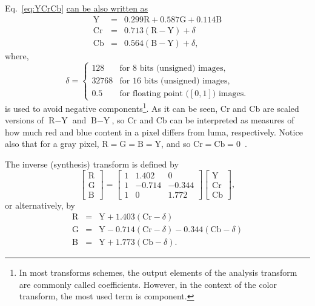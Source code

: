 Eq.~\ref{eq:YCrCb}
\href{https://docs.opencv.org/3.4/de/d25/imgproc_color_conversions.html}{can
  be also written as}
\begin{equation}
  \begin{array}{lcl}
    \text{Y}  & = & 0.299\text{R} + 0.587\text{G} + 0.114\text{B} \\
    \text{Cr} & = & 0.713(\text{R} - \text{Y}) + \delta \\
    \text{Cb} & = & 0.564(\text{B} - \text{Y}) + \delta,
  \end{array}
  \label{eq:analysis}
\end{equation}
where,
\begin{equation}
  \delta = \left\{
  \begin{array}{ll}
    128 & \text{for 8 bits (unsigned) images},\\
    32768 & \text{for 16 bits (unsigned) images},\\
    0.5 & \text{for floating point (}[0,1]\text{) images}.
  \end{array}
  \right.
  \label{eq:iYCrCb}
\end{equation}
is used to avoid negative components\footnote{In most transforms
  schemes, the output elements of the analysis transform are commonly
  called coefficients. However, in the context of the color transform,
  the most used term is component.}. As it can be seen, Cr and Cb are
scaled versions of $\text{R} - \text{Y}$ and $\text{B} - \text{Y}$, so
Cr and Cb can be interpreted as measures of how much red and blue
content in a pixel differs from luma, respectively. Notice also that
for a gray pixel, $\text{R}=\text{G}=\text{B}=\text{Y}$, and so
$\text{Cr}=\text{Cb}=0$~\cite{malvar2008lifting}.

The inverse (synthesis) transform is defined by
\begin{equation}
  \begin{bmatrix}
    \text{R} \\
    \text{G} \\
    \text{B}
  \end{bmatrix}
  =
  \begin{bmatrix}
    1  &  1.402  & 0 \\ 
    1  &  -0.714  &  -0.344 \\ 
    1  & 0  & 1.772
  \end{bmatrix}
  \begin{bmatrix}
    \text{Y} \\
    \text{Cr} \\
    \text{Cb}
  \end{bmatrix},
\end{equation}
or alternatively, by
\begin{equation}
  \begin{array}{lcl}
    \text{R} & = & \text{Y} + 1.403(\text{Cr} - \delta) \\
    \text{G} & = & \text{Y} - 0.714(\text{Cr} - \delta) - 0.344(\text{Cb} - \delta)\\
    \text{B} & = & \text{Y} + 1.773(\text{Cb} - \delta).
  \end{array}
  \label{eq:synthesis}
\end{equation}

